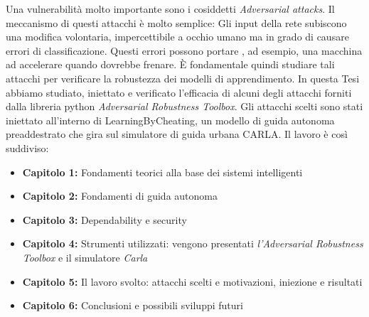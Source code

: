 Una vulnerabilità molto importante sono i cosiddetti \emph{Adversarial attacks}. Il meccanismo di questi attacchi è molto semplice:
Gli input della rete  subiscono una modifica volontaria, impercettibile a occhio umano ma in grado di causare errori di  classificazione.  Questi errori possono portare , ad esempio, una macchina ad accelerare quando
dovrebbe frenare. È fondamentale quindi studiare tali attacchi per verificare la robustezza dei modelli di apprendimento.
In questa Tesi abbiamo studiato, iniettato e verificato l'efficacia di  alcuni degli attacchi forniti dalla libreria python \emph{Adversarial Robustness Toolbox}. Gli attacchi scelti sono stati iniettato all'interno
di LearningByCheating, un modello di guida autonoma preaddestrato che gira sul simulatore di guida urbana CARLA.
Il lavoro è così suddiviso:
\begin{itemize}
  \item \textbf{Capitolo 1:} Fondamenti teorici alla base dei sistemi intelligenti
  \item \textbf{Capitolo 2:} Fondamenti di guida autonoma
  \item \textbf{Capitolo 3:} Dependability e security
  \item \textbf{Capitolo 4:} Strumenti utilizzati: vengono presentati \emph{l'Adversarial Robustness Toolbox} e il simulatore \emph{Carla}
  \item \textbf{Capitolo 5:} Il lavoro svolto: attacchi scelti e motivazioni, iniezione e risultati
  \item \textbf{Capitolo 6:} Conclusioni e possibili sviluppi futuri
  
\end{itemize}


